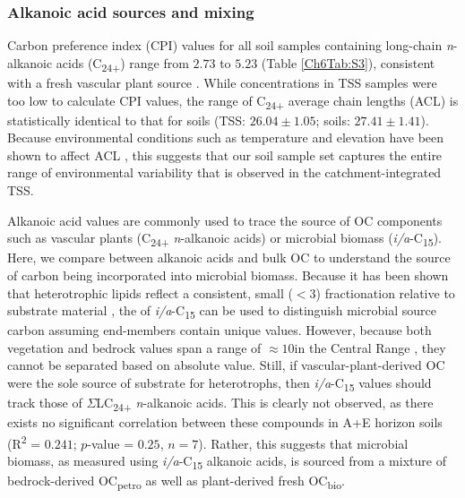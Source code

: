 \subsubsection{Alkanoic acid sources and mixing}\label{Ch6SD5}

Carbon preference index (CPI) values for all soil samples containing long-chain \textit{n}-alkanoic acids (C\textsubscript{24+}) range from $2.73$ to $5.23$ (Table \ref{Ch6Tab:S3}), consistent with a fresh vascular plant source \citep{Eglinton:1967uz}. While concentrations in TSS samples were too low to calculate CPI values, the range of C\textsubscript{24+} average chain lengths (ACL) is statistically identical to that for soils (TSS: $26.04 \pm 1.05$; soils: $27.41 \pm 1.41$). Because environmental conditions such as temperature and elevation have been shown to affect ACL \citep{Bush:2013ie}, this suggests that our soil sample set captures the entire range of environmental variability that is observed in the catchment-integrated TSS.

Alkanoic acid  values are commonly used to trace the source of OC components such as vascular plants (C\textsubscript{24+} \textit{n}-alkanoic acids) or microbial biomass (\textit{i/a}-C\textsubscript{15}). Here, we compare  between alkanoic acids and bulk OC to understand the source of carbon being incorporated into microbial biomass. Because it has been shown that heterotrophic lipids reflect a consistent, small ($< 3$\textperthousand)  fractionation relative to substrate material \citep{Blair:1985ti}, the  of \textit{i/a}-C\textsubscript{15} can be used to distinguish microbial source carbon assuming end-members contain unique  values. However, because both vegetation and bedrock  values span a range of $\approx 10$\textperthousand in the Central Range \citep{Hilton:2010cg,Hilton:2013kq}, they cannot be separated based on absolute value. Still, if vascular-plant-derived OC were the sole source of substrate for heterotrophs, then \textit{i/a}-C\textsubscript{15}  values should track those of $\Sigma$LC\textsubscript{24+} \textit{n}-alkanoic acids. This is clearly not observed, as there exists no significant correlation between these compounds in A+E horizon soils (R\textsuperscript{2} = $0.241$; $p$-value = $0.25$, $n = 7$). Rather, this suggests that microbial biomass, as measured using \textit{i/a}-C\textsubscript{15} alkanoic acids, is sourced from a mixture of bedrock-derived OC\textsubscript{petro} as well as plant-derived fresh OC\textsubscript{bio}.


